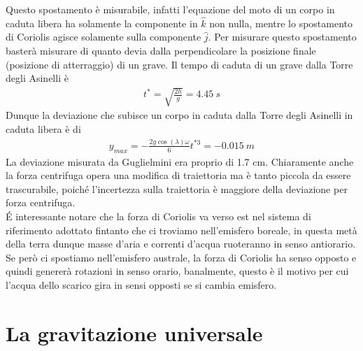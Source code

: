 Questo spostamento è misurabile, infatti l'equazione del moto di un corpo in caduta libera ha solamente la componente in $\hat{k}$ non nulla, mentre lo spostamento di Coriolis agisce solamente sulla componente $\hat{j}$. Per misurare questo spostamento basterà misurare di quanto devia dalla perpendicolare la posizione finale (posizione di atterraggio) di un grave. Il tempo di caduta di un grave dalla Torre degli Asinelli è 
\begin{align*}
	t^* = \sqrt{\frac{2h}{g}} = 4.45\ s
\end{align*}
Dunque la deviazione che subisce un corpo in caduta dalla Torre degli Asinelli in caduta libera è di
\begin{align*}
	y_{max} = -\frac{2g\cos(\lambda)\omega}{6} t^{*3} = -0.015\ m
\end{align*}
La deviazione misurata da Guglielmini era proprio di 1.7 cm. Chiaramente anche la forza centrifuga opera una modifica di traiettoria ma è tanto piccola da essere trascurabile, poiché l'incertezza sulla traiettoria è maggiore della deviazione per forza centrifuga.\\
\'{E} interessante notare che la forza di Coriolis va verso est nel sistema di riferimento adottato fintanto che ci troviamo nell'emisfero boreale, in questa metà della terra dunque masse d'aria e correnti d'acqua ruoteranno in senso antiorario. Se però ci spostiamo nell'emisfero australe, la forza di Coriolis ha senso opposto e quindi genererà rotazioni in senso orario, banalmente, questo è il motivo per cui l'acqua dello scarico gira in sensi opposti se si cambia emisfero. 
\section{La gravitazione universale}
